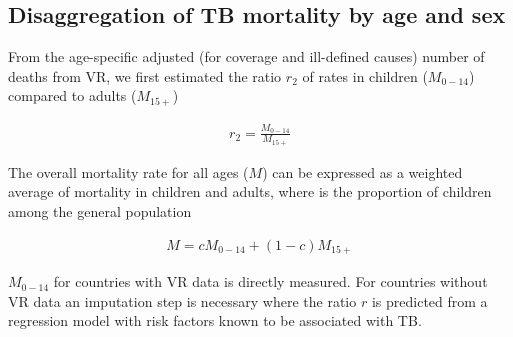 \subsection{Disaggregation of TB mortality by age and sex}


From the age-specific adjusted (for coverage and ill-defined causes) number of deaths from VR, we first estimated the ratio $r_2$ of rates in children ($M_{0-14}$) compared to adults ($M_{15+}$) 

\begin{align*}
r_2 = \frac{M_{0-14}}{M_{15+}}
\end{align*}

The overall mortality rate for all ages ($M$) can be expressed as a weighted average of mortality in children and adults, where  is the proportion of children among the general population 

\begin{align*}
M = c M_{0-14} + (1 - c) M_{15+}
\end{align*}

$M_{0-14}$ for countries with VR data is directly measured. For countries without VR data an imputation step is necessary where the ratio $r$ is predicted from a regression model with risk factors known to be associated with TB.